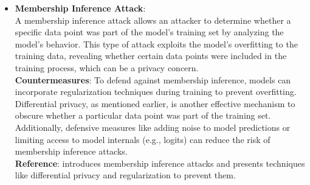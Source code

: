 \documentclass[12pt]{article}
\begin{document}
\begin{itemize}
        \item \textbf{Membership Inference Attack}: \\
        A membership inference attack allows an attacker to determine whether a specific data point was part of the model’s training set by analyzing the model’s behavior. This type of attack exploits the model’s overfitting to the training data, revealing whether certain data points were included in the training process, which can be a privacy concern. \\
        \textbf{Countermeasures}: To defend against membership inference, models can incorporate regularization techniques during training to prevent overfitting. Differential privacy, as mentioned earlier, is another effective mechanism to obscure whether a particular data point was part of the training set. Additionally, defensive measures like adding noise to model predictions or limiting access to model internals (e.g., logits) can reduce the risk of membership inference attacks. \\
        \textbf{Reference}: \cite{Shokri_2017} introduces membership inference attacks and presents techniques like differential privacy and regularization to prevent them.

    \end{itemize}
\end{document}
